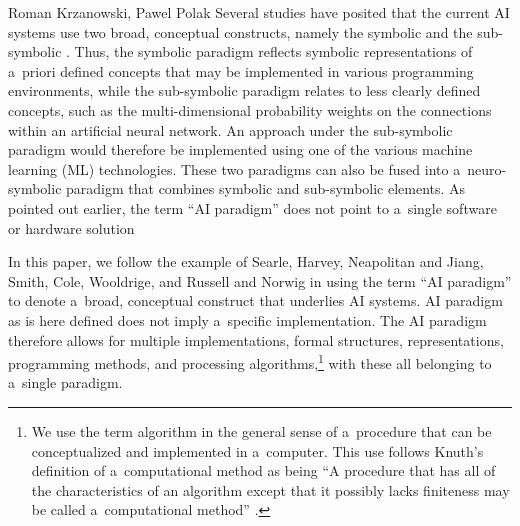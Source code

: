 \begin{artengenv2auth}{Roman Krzanowski, Pawel Polak}
Several studies have posited that the current AI systems use two broad, conceptual constructs, namely the symbolic and the sub-symbolic
\parencites[e.g.,][]{searle_mind_1998}[][]{harvey_perspectives_2013}[][]{neapolitan_artificial_2018}[][]{mitchell_artificial_2019}[][]{smith_promise_2019}[][]{cole_chinese}[][]{russell_artificial_2020}[][]{wooldridge_road_2021}. %
 Thus, the symbolic paradigm reflects symbolic representations of a~priori defined concepts that may be implemented in various programming environments, while the sub-symbolic paradigm relates to less clearly defined concepts, such as the multi-dimensional probability weights on the connections within an artificial neural network. An approach under the sub-symbolic paradigm would therefore be implemented using one of the various machine learning (ML) technologies. These two paradigms can also be fused into a~neuro-symbolic paradigm 
\parencites[e.g.,][]{bader_dimensions_2005}[][]{garcez_neural-symbolic_2019}[][]{garcez_neurosymbolic_2020}[][]{kautz_third_2022} %
 that combines symbolic and sub-symbolic elements. As pointed out earlier, the term ``AI paradigm'' does not point to a~single software or hardware solution 
\parencites[see][]{minsky_logical_1991}[][]{russell_artificial_2020}%

In this paper, we follow the example of Searle, Harvey, Neapolitan and Jiang, Smith, Cole, Wooldrige, and Russell and Norwig in using the term ``AI paradigm'' to denote a~broad, conceptual construct that underlies AI systems. AI paradigm as is here defined does not imply a~specific implementation. The AI paradigm therefore allows for multiple implementations, formal structures, representations, programming methods, and processing algorithms,\footnote{We use the term algorithm in the general sense of a~procedure that can be conceptualized and implemented in a~computer. This use follows Knuth's definition of a~computational method as being ``A procedure that has all of the characteristics of an algorithm except that it possibly lacks finiteness may be called a~computational method''
\parencite[][p.5]{knuth_art_2005}.%
} with these all belonging to a~single paradigm.


\end{artengenv2auth}
